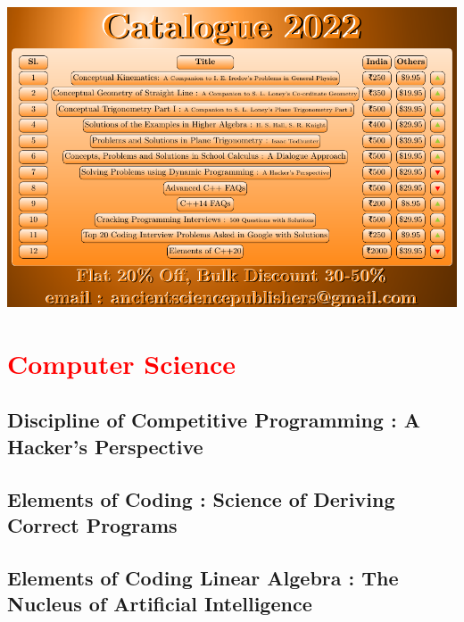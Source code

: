\documentclass[makeidx, 12pt, oneside, onecolumn, openright, final, svgnames, dvipsnames, extrafontsizes]{memoir}
\renewcommand{\chaptername}{Dialogue}
\theoremstyle{problemstyle}
\begin{document}
  \begin{center}
    \includegraphics[width=1.0\textwidth]{catalogue/asp-catalogue}
  \end{center}


\renewcommand{\contentsname}{Monographs}

\tableofcontents*


\mainmatter

\setlength{\headwidth}{\textwidth}
\setlength{\headwidth}{\textwidth}

\renewcommand{\chaptername}{Monograph}

\part{\textcolor{red}{Computer Science}}

\chapter{Discipline of Competitive Programming : A Hacker’s Perspective}


\chapter{Elements of Coding : Science of Deriving Correct Programs}


\chapter{Elements of Coding Linear Algebra : The Nucleus of Artificial Intelligence}

\end{document}
